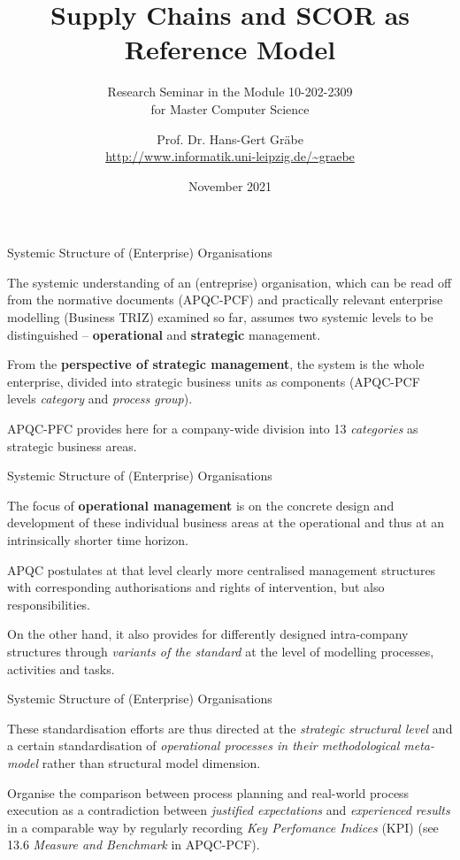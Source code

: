 \documentclass{beamer}
\title{Supply Chains and SCOR as Reference Model}
\subtitle{Research Seminar in the Module 10-202-2309\\ for Master Computer
  Science}
\author{Prof. Dr. Hans-Gert Gräbe\\
\url{http://www.informatik.uni-leipzig.de/~graebe}}
\date{November 2021}
\begin{document}
{
\begin{frame}
  \titlepage
\end{frame}}

\begin{frame}{Systemic Structure of (Enterprise) Organisations}

The systemic understanding of an (entreprise) organisation, which can be read
off from the normative documents (APQC-PCF) and practically relevant
enterprise modelling (Business TRIZ) examined so far, assumes two systemic
levels to be distinguished -- \textbf{operational} and \textbf{strategic}
management.

From the \textbf{perspective of strategic management}, the system is the whole
enterprise, divided into strategic business units as components (APQC-PCF
levels \emph{category} and \emph{process group}).

APQC-PFC provides here for a company-wide division into 13 \emph{categories}
as strategic business areas.
\end{frame}

\begin{frame}{Systemic Structure of (Enterprise) Organisations}

The focus of \textbf{operational management} is on the concrete design and
development of these individual business areas at the operational and thus at
an intrinsically shorter time horizon.

APQC postulates at that level clearly more centralised management structures
with corresponding authorisations and rights of intervention, but also
responsibilities.

On the other hand, it also provides for differently designed intra-company
structures through \emph{variants of the standard} at the level of modelling
processes, activities and tasks.
\end{frame}

\begin{frame}{Systemic Structure of (Enterprise) Organisations}

These standardisation efforts are thus directed at the \emph{strategic
  structural level} and a certain standardisation of \emph{operational
  processes in their methodological meta-model} rather than structural model
dimension.

Organise the comparison between process planning and real-world process
execution as a contradiction between \emph{justified expectations} and
\emph{experienced results} in a comparable way by regularly recording
\emph{Key Perfomance Indices} (KPI) (see 13.6 \emph{Measure and Benchmark} in
APQC-PCF).

\end{frame}
\end{document}
